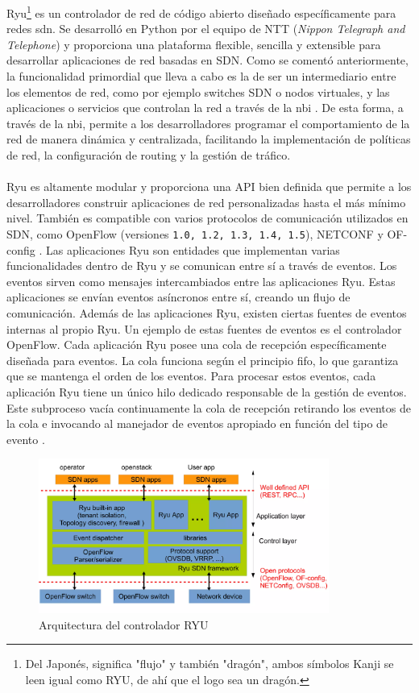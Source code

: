 Ryu\footnote{Del Japonés, significa "flujo" y también "dragón", ambos símbolos Kanji se leen igual como RYU, de ahí que el logo sea un dragón.} es un controlador de red de código abierto diseñado específicamente para redes \gls{sdn}. Se desarrolló en Python por el equipo de NTT (\textit{Nippon Telegraph and Telephone}) y proporciona una plataforma flexible, sencilla y extensible para desarrollar aplicaciones de red basadas en SDN. Como se comentó anteriormente, la funcionalidad primordial que lleva a cabo es la de ser un intermediario entre los elementos de red, como por ejemplo switches SDN o nodos virtuales, y las aplicaciones o servicios que controlan la red a través de la \gls{nbi} \cite{tomonori2013introduction}. De esta forma, a través de la \gls{nbi}, permite a los desarrolladores programar el comportamiento de la red de manera dinámica y centralizada, facilitando la implementación de políticas de red, la configuración de routing y la gestión de tráfico.\\
\\
Ryu es altamente modular y proporciona una API bien definida que permite a los desarrolladores construir aplicaciones de red personalizadas hasta el más mínimo nivel. También es compatible con varios protocolos de comunicación utilizados en SDN, como OpenFlow (versiones \texttt{1.0, 1.2, 1.3, 1.4, 1.5}), NETCONF y OF-config \cite{tomonori2013introduction}.  Las aplicaciones Ryu son entidades que implementan varias funcionalidades dentro de Ryu y se comunican entre sí a través de eventos. Los eventos sirven como mensajes intercambiados entre las aplicaciones Ryu. Estas aplicaciones se envían eventos asíncronos entre sí, creando un flujo de comunicación. Además de las aplicaciones Ryu, existen ciertas fuentes de eventos internas al propio Ryu. Un ejemplo de estas fuentes de eventos es el controlador OpenFlow. Cada aplicación Ryu posee una cola de recepción específicamente diseñada para eventos. La cola funciona según el principio \gls{fifo}, lo que garantiza que se mantenga el orden de los eventos. Para procesar estos eventos, cada aplicación Ryu tiene un único hilo dedicado responsable de la gestión de eventos. Este subproceso vacía continuamente la cola de recepción retirando los eventos de la cola e invocando al manejador de eventos apropiado en función del tipo de evento \cite{ryu1}.

\begin{figure}[ht]
    \centering
    \includegraphics[width=0.85\textwidth]{archivos/img/teoria/ryu.png}
    \caption{Arquitectura del controlador  RYU \cite{ryu2}}
    \label{fig:ryu}
\end{figure}


